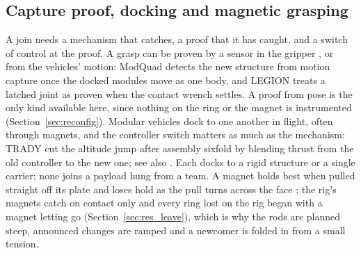 
\subsection{Capture proof, docking and magnetic grasping}
\label{sec:lit_capture}

A join needs a mechanism that catches, a proof that it has caught, and a switch of control at the proof. A grasp can
be proven by a sensor in the gripper \cite{shankar2020inflight}, or from the vehicles' motion: ModQuad
\cite{saldana2018modquad} detects the new structure from motion capture once the docked modules move as one body, and
LEGION \cite{sugihara2026legion} treats a latched joint as proven when the contact wrench settles. A proof from pose is
the only kind available here, since nothing on the ring or the magnet is instrumented (Section~\ref{sec:reconfig}).
Modular vehicles dock to one another in flight, often through magnets, and the controller switch matters as much as
the mechanism: TRADY \cite{sugihara2023trady} cut the altitude jump after assembly sixfold by blending thrust from the old
controller to the new one; see also \cite{zhang2026epm, miyazaki2018airborne, antal2026hook, xu2026hitches}. Each
docks to a rigid structure or a single carrier; none joins a payload hung from a team. A magnet holds best when pulled
straight off its plate and loses hold as the pull turns across the face \cite{gawel2017magnetic}; the rig's magnets catch
on contact only and every ring lost on the rig began with a magnet letting go (Section~\ref{sec:res_leave}), which is why
the rods are planned steep, announced changes are ramped and a newcomer is folded in from a small tension.
